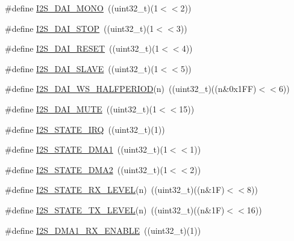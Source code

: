 \begin{DoxyCompactItemize}
\item 
\#define \hyperlink{group___i2_s___private___macros_ga352feb095d028efc44d17f72beacfae5}{\-I2\-S\-\_\-\-D\-A\-I\-\_\-\-M\-O\-N\-O}~((uint32\-\_\-t)(1$<$$<$2))
\item 
\#define \hyperlink{group___i2_s___private___macros_ga2ed2d2a9f59339ad3cf1f28a78bfcad6}{\-I2\-S\-\_\-\-D\-A\-I\-\_\-\-S\-T\-O\-P}~((uint32\-\_\-t)(1$<$$<$3))
\item 
\#define \hyperlink{group___i2_s___private___macros_gae57a0b564a399a726a9a6737f5733beb}{\-I2\-S\-\_\-\-D\-A\-I\-\_\-\-R\-E\-S\-E\-T}~((uint32\-\_\-t)(1$<$$<$4))
\item 
\#define \hyperlink{group___i2_s___private___macros_ga664f6b8ac38d7b3a23aae4e7a2fa1c6f}{\-I2\-S\-\_\-\-D\-A\-I\-\_\-\-S\-L\-A\-V\-E}~((uint32\-\_\-t)(1$<$$<$5))
\item 
\#define \hyperlink{group___i2_s___private___macros_gab175fcd8e7e80e59833b596a90b16f79}{\-I2\-S\-\_\-\-D\-A\-I\-\_\-\-W\-S\-\_\-\-H\-A\-L\-F\-P\-E\-R\-I\-O\-D}(n)~((uint32\-\_\-t)((n\&0x1\-F\-F)$<$$<$6))
\item 
\#define \hyperlink{group___i2_s___private___macros_ga29f425732f2c019dd69819f7a01740ad}{\-I2\-S\-\_\-\-D\-A\-I\-\_\-\-M\-U\-T\-E}~((uint32\-\_\-t)(1$<$$<$15))
\item 
\#define \hyperlink{group___i2_s___private___macros_gaa412bd295235fcd4d7f0ad284d9386de}{\-I2\-S\-\_\-\-S\-T\-A\-T\-E\-\_\-\-I\-R\-Q}~((uint32\-\_\-t)(1))
\item 
\#define \hyperlink{group___i2_s___private___macros_ga0e9a701addd279db953ca34d56487dbd}{\-I2\-S\-\_\-\-S\-T\-A\-T\-E\-\_\-\-D\-M\-A1}~((uint32\-\_\-t)(1$<$$<$1))
\item 
\#define \hyperlink{group___i2_s___private___macros_ga84dfa37fbee79986ec79f4d856b8df24}{\-I2\-S\-\_\-\-S\-T\-A\-T\-E\-\_\-\-D\-M\-A2}~((uint32\-\_\-t)(1$<$$<$2))
\item 
\#define \hyperlink{group___i2_s___private___macros_gab51548f7e41cb523a77beb7c88c5d33a}{\-I2\-S\-\_\-\-S\-T\-A\-T\-E\-\_\-\-R\-X\-\_\-\-L\-E\-V\-E\-L}(n)~((uint32\-\_\-t)((n\&1\-F)$<$$<$8))
\item 
\#define \hyperlink{group___i2_s___private___macros_ga2421a91f0ddda94150de2f80c4192039}{\-I2\-S\-\_\-\-S\-T\-A\-T\-E\-\_\-\-T\-X\-\_\-\-L\-E\-V\-E\-L}(n)~((uint32\-\_\-t)((n\&1\-F)$<$$<$16))
\item 
\#define \hyperlink{group___i2_s___private___macros_ga7b643833c4b80116d3026c7933449001}{\-I2\-S\-\_\-\-D\-M\-A1\-\_\-\-R\-X\-\_\-\-E\-N\-A\-B\-L\-E}~((uint32\-\_\-t)(1))
\item 

\end{DoxyCompactItemize}
